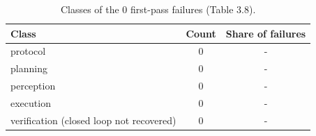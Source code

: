 \begin{table}[htbp]
\centering
\caption{Classes of the 0 first-pass failures (Table 3.8).}
\label{tab:rdt_attribution}
\small
\begin{tabular}{lcc}
\toprule
Class & Count & Share of failures \\
\midrule
protocol & 0 & - \\
planning & 0 & - \\
perception & 0 & - \\
execution & 0 & - \\
verification (closed loop not recovered) & 0 & - \\
\bottomrule
\end{tabular}
\end{table}

